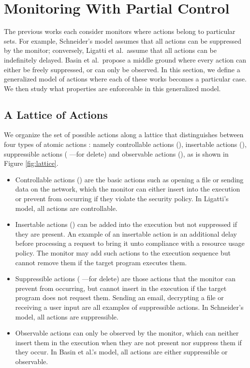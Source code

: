 \documentclass[12pt]{article}
\begin{document}
\section{Monitoring With Partial Control}\label{sec:partial}

The previous works each consider monitors where actions belong to particular sets. For example, Schneider's model assumes that all actions can be suppressed by the monitor; conversely, Ligatti et al.\ assume that all actions can be indefinitely delayed. Basin et al.\ propose a middle ground where every action can either be freely suppressed, or can only be observed. In this section, we define a generalized model of actions where each of these works becomes a particular case. We then study what properties are enforceable in this generalized model.

\subsection{A Lattice of Actions}

We organize the set of possible actions along a lattice that distinguishes between four types of atomic actions :  namely controllable actions (), insertable actions (), suppressible actions ( ---for delete) and observable actions (), as is shown in Figure \ref{fig:lattice}.
\begin{itemize}
  \item Controllable actions () are the basic actions such as opening a file or sending data on the network, which the monitor can either insert into the execution or prevent from occurring if they violate the security policy. In Ligatti's model, all actions are controllable.
  \item Insertable actions () can be added into the execution but not suppressed if they are present. An example of an insertable action is an additional delay before processing a request to bring it unto compliance with a resource usage policy. The monitor may add such actions to the execution sequence but cannot remove them if the target program executes them.
  \item Suppressible actions ( ---for delete) are those actions that the monitor can prevent from occurring, but cannot insert in the execution if the target program  does not request them. Sending an email, decrypting a file or receiving a user input are all examples of suppressible actions. In Schneider's model, all actions are suppressible.
  \item Observable actions  can only be observed by the monitor, which can neither insert them in the execution when they are not present  nor suppress them if they occur. In Basin et al.'s model, all actions are either suppressible or observable.
\end{itemize}
\end{document}

